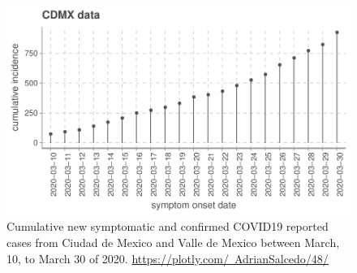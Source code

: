 %
\begin{figure}[htb]
    \centering
    \includegraphics[scale=0.8, keepaspectratio]{Figures/cdmx_input_data}
    \caption{%
        Cumulative new symptomatic and confirmed COVID19 reported cases from
        Ciudad de Mexico and Valle de Mexico
        \cite{cdmxDATA} between March, 10, to March 30 of
        2020.
        \href{https://plotly.com/~AdrianSalcedo/48/}{%
		https://plotly.com/~AdrianSalcedo/48/}
	}
    \label{fig:data_CDMX}
\end{figure}
%
